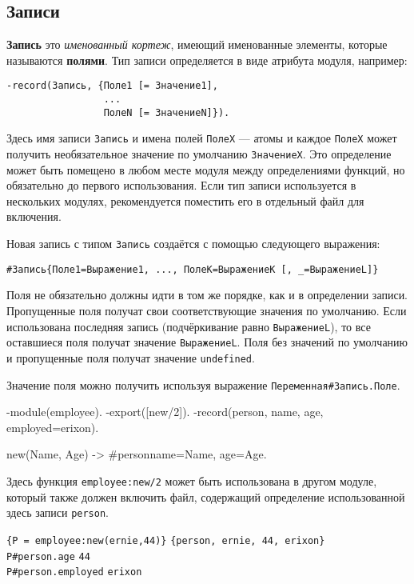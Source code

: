 \subsection{Записи}
\label{datatypes:record}

\textbf{Запись} это \emph{именованный кортеж}, имеющий именованные элементы,
которые называются \textbf{полями}. Тип записи определяется в виде атрибута 
модуля, например:

\begin{verbatim}
-record(Запись, {Поле1 [= Значение1],
                 ...
                 ПолеN [= ЗначениеN]}).
\end{verbatim}

Здесь имя записи \texttt{Запись} и имена полей \texttt{ПолеХ} --- атомы и каждое
\texttt{ПолеX} может получить необязательное значение по умолчанию
\texttt{ЗначениеX}. Это определение может быть помещено в любом месте модуля между
определениями функций, но обязательно до первого использования. Если тип записи
используется в нескольких модулях, рекомендуется поместить его в отдельный файл
для включения.

Новая запись с типом \texttt{Запись} создаётся с помощью следующего выражения:

\begin{verbatim}
#Запись{Поле1=Выражение1, ..., ПолеK=ВыражениеK [, _=ВыражениеL]}
\end{verbatim}

Поля не обязательно должны идти в том же порядке, как и в определении записи.
Пропущенные поля получат свои соответствующие значения по умолчанию. Если 
использована последняя запись (подчёркивание равно \texttt{ВыражениеL}), то все
оставшиеся поля получат значение \texttt{ВыражениеL}. Поля без значений по
умолчанию и пропущенные поля получат значение \texttt{undefined}.

Значение поля можно получить используя выражение \texttt{Переменная\#Запись.Поле}.

\begin{erlang}
-module(employee).
-export([new/2]).
-record(person, {name, age, employed=erixon}).

new(Name, Age) -> #person{name=Name, age=Age}.
\end{erlang}

Здесь функция \texttt{employee:new/2} может быть использована в другом модуле,
который также должен включить файл, содержащий определение использованной здесь
записи \texttt{person}.

\texttt{\{P = employee:new(ernie,44)\}} \resultingin \texttt{\{person, ernie, 44,
erixon\}} \\
\texttt{P\#person.age} \resultingin \texttt{44} \\
\texttt{P\#person.employed} \resultingin \texttt{erixon}


